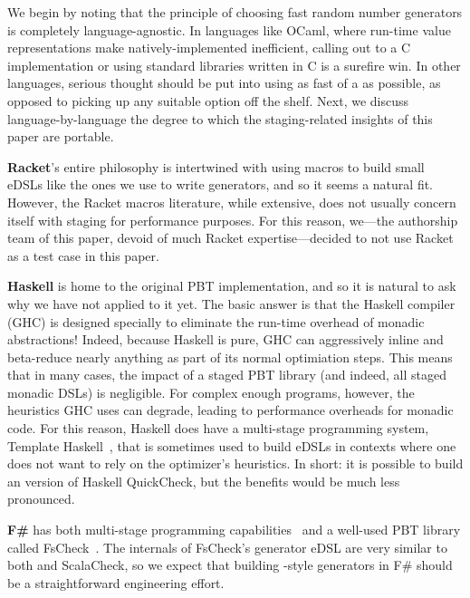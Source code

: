 \documentclass[acmsmall]{acmart}
\theoremstyle{definition}
\begin{document}
We begin by noting that the principle of choosing fast random number generators
is completely language-agnostic. In languages like OCaml, where run-time value representations
make natively-implemented \rand inefficient, calling out to a C implementation or using standard libraries written in C is a surefire win.
In other languages, serious thought should be put into using as fast of a \rand{} as possible,
as opposed to picking up any suitable option off the shelf.
Next, we discuss language-by-language the degree to which the staging-related insights of this paper are portable.

  \textbf{Racket}'s entire philosophy is intertwined with
  using macros to build small eDSLs like the ones we use to write generators, and so it seems a natural fit.
  However, the Racket macros literature, while extensive, does not usually concern itself with staging for performance purposes.
  For this reason, we---the authorship team of this paper, devoid of much Racket expertise---decided to not use Racket as a test case in this paper.

  \textbf{Haskell} is home to the original PBT implementation, and
  so it is natural to ask why we have not applied \name{} to it yet. The basic
  answer is that the Haskell compiler (GHC) is designed specially to eliminate
  the run-time overhead of monadic abstractions! Indeed, because Haskell is
  pure, GHC can aggressively inline and beta-reduce nearly anything as part of
  its normal optimiation steps.  This means that in many cases, the impact of a
  staged PBT library (and indeed, all staged monadic DSLs) is negligible.  For
  complex enough programs, however, the heuristics GHC uses can degrade, leading
  to performance overheads for monadic code.  For this reason, Haskell does have
  a multi-stage programming system, Template Haskell~\cite{templatehaskell}, that is
  sometimes used to build eDSLs in contexts where one does not want to rely on the
  optimizer's heuristics.  In short: it is possible to build an \name{} version of Haskell
  QuickCheck, but the benefits would be much less pronounced.

  \textbf{F\#} has both multi-stage programming capabilities~\cite{fsmeta} and a well-used PBT library called FsCheck~\cite{fscheck}.
  The internals of FsCheck's generator eDSL are very similar to both
  \bq and ScalaCheck, so we expect that building \name{}-style generators
  in F\# should be a straightforward engineering effort.
\end{document}

